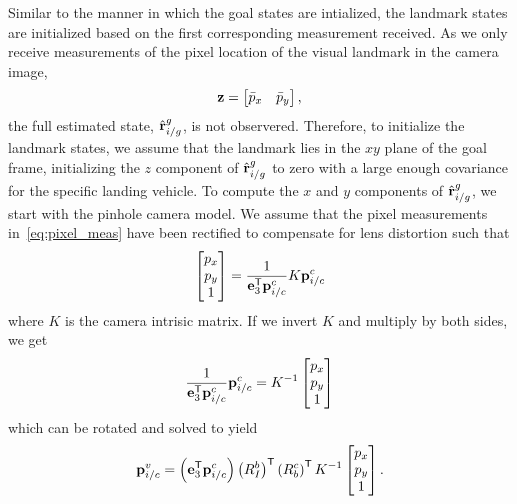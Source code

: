 Similar to the manner in which the goal states are intialized,
the landmark states are initialized based on the first corresponding measurement received.
As we only receive measurements of the pixel
location of the visual landmark in the camera image,
\begin{equation}
  \vect{z} = \begin{bmatrix} \bar{p}_x & \bar{p}_y \end{bmatrix}
  \label{eq:pixel_meas},
\end{equation}
the full estimated state, $\hat{\boldsymbol{\mathrm{r}}}_{i/g}^g$, is not observered.
Therefore, to initialize
the landmark states, we assume that the landmark lies in the $xy$ plane of the
goal frame, initializing the $z$ component of $\hat{\boldsymbol{\mathrm{r}}}_{i/g}^g$ to zero with a
large enough covariance for the specific landing vehicle. To compute the
$x$ and $y$ components of $\hat{\boldsymbol{\mathrm{r}}}_{i/g}^g$, we start with the pinhole camera
model. We assume that the pixel measurements in~\eqref{eq:pixel_meas} have been
rectified to compensate for lens distortion such that
\begin{equation}
  \begin{bmatrix}
    p_x \\ p_y \\ 1
  \end{bmatrix} = \frac{1}{\boldsymbol{\mathrm{e}}_3^{\mathsf{T}} \boldsymbol{\mathrm{p}}_{i/c}^c} K \boldsymbol{\mathrm{p}}_{i/c}^c \\
\end{equation}
where $K$ is the camera intrisic matrix. If we invert $K$ and multiply by both
sides, we get
\begin{equation}
 \frac{1}{\boldsymbol{\mathrm{e}}_3^{\mathsf{T}} \boldsymbol{\mathrm{p}}_{i/c}^c} \boldsymbol{\mathrm{p}}_{i/c}^c
  =
  K^{-1} \begin{bmatrix}
    p_x \\ p_y \\ 1
  \end{bmatrix}
\end{equation}
which can be rotated and solved to yield
\begin{equation}
 \boldsymbol{\mathrm{p}}_{i/c}^v
  =
  \left( \boldsymbol{\mathrm{e}}_3^{\mathsf{T}} \boldsymbol{\mathrm{p}}_{i/c}^c \right) \left( R_I^b
  \right)^{\mathsf{T}} \left( R_b^c \right)^{\mathsf{T}} K^{-1} \begin{bmatrix}
    p_x \\ p_y \\ 1
  \end{bmatrix}.
\end{equation}
